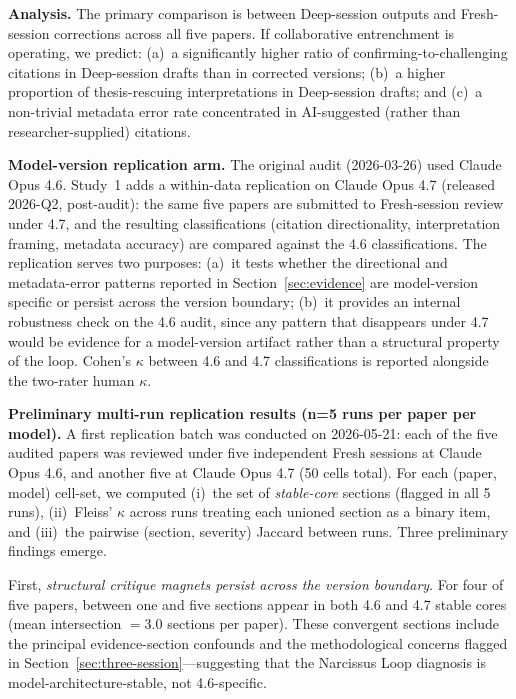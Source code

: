 \documentclass[12pt]{article}
\begin{document}
\textbf{Analysis.} The primary comparison is between Deep-session outputs and Fresh-session corrections across all five papers. If collaborative entrenchment is operating, we predict: (a)~a significantly higher ratio of confirming-to-challenging citations in Deep-session drafts than in corrected versions; (b)~a higher proportion of thesis-rescuing interpretations in Deep-session drafts; and (c)~a non-trivial metadata error rate concentrated in AI-suggested (rather than researcher-supplied) citations.

\textbf{Model-version replication arm.} The original audit (2026-03-26) used Claude Opus 4.6. Study~1 adds a within-data replication on Claude Opus 4.7 (released 2026-Q2, post-audit): the same five papers are submitted to Fresh-session review under 4.7, and the resulting classifications (citation directionality, interpretation framing, metadata accuracy) are compared against the 4.6 classifications. The replication serves two purposes: (a)~it tests whether the directional and metadata-error patterns reported in Section~\ref{sec:evidence} are model-version specific or persist across the version boundary; (b)~it provides an internal robustness check on the 4.6 audit, since any pattern that disappears under 4.7 would be evidence for a model-version artifact rather than a structural property of the loop. Cohen's $\kappa$ between 4.6 and 4.7 classifications is reported alongside the two-rater human $\kappa$.

\textbf{Preliminary multi-run replication results (n=5 runs per paper per model).} A first replication batch was conducted on 2026-05-21: each of the five audited papers was reviewed under five independent Fresh sessions at Claude Opus 4.6, and another five at Claude Opus 4.7 (50 cells total). For each (paper, model) cell-set, we computed (i)~the set of \emph{stable-core} sections (flagged in all 5 runs), (ii)~Fleiss' $\kappa$ across runs treating each unioned section as a binary item, and (iii)~the pairwise (section, severity) Jaccard between runs. Three preliminary findings emerge.

First, \emph{structural critique magnets persist across the version boundary}. For four of five papers, between one and five sections appear in both 4.6 and 4.7 stable cores (mean intersection $= 3.0$ sections per paper). These convergent sections include the principal evidence-section confounds and the methodological concerns flagged in Section~\ref{sec:three-session}---suggesting that the Narcissus Loop diagnosis is model-architecture-stable, not 4.6-specific.
\end{document}
